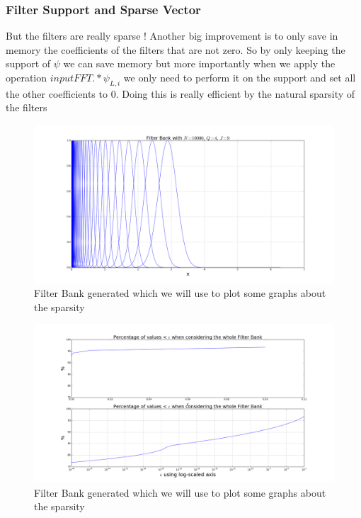 \documentclass[a4paper]{report}
\begin{document}
\subsubsection{Filter Support and Sparse Vector}
But the filters are really sparse ! Another big improvement is to only save in memory the coefficients of the filters that are not zero. So by only keeping the support of $\psi$ we can save memory but more importantly when we apply the operation $inputFFT .* \psi_{L,i}$ we only need to perform it on the support and set all the other coefficients to $0$. Doing this is really efficient by the natural sparsity of the filters

\begin{figure}[H]
\begin{center}
\includegraphics[scale=0.31]{filter_bank.png}\caption{Filter Bank generated which we will use to plot some graphs about the sparsity}
\end{center}
\end{figure}

\begin{figure}[H]
\begin{center}
\includegraphics[scale=0.31]{sparsity_filters.png}\caption{Filter Bank generated which we will use to plot some graphs about the sparsity}
\end{center}
\end{figure}
\end{document}
